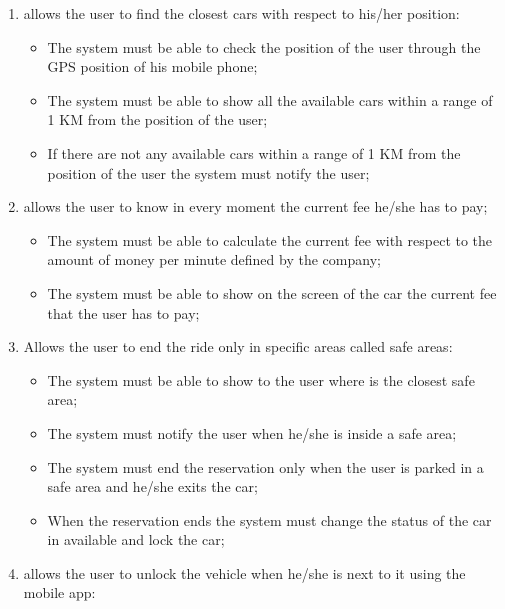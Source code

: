 \begin{enumerate}
\item allows the user to find the closest cars with respect to his/her position:

\begin{itemize}
\item The system must be able to check the position of the user through the GPS position of his mobile phone;
\item The system must be able to show all the available cars within a range of 1 KM from the position of the user;
\item If there are not any available cars within a range of 1 KM from the position of the user the system must notify the user;
\end{itemize}

\item allows the user to know in every moment the current fee he/she has to pay;

\begin{itemize}
\item The system must be able to calculate the current fee with respect to the amount of money per minute defined by the company;
\item The system must be able to show on the screen of the car the current fee that the user has to pay;
\end{itemize}

\item Allows the user to end the ride only in specific areas called safe areas:

\begin{itemize}
\item The system must be able to show to the user where is the closest safe area;
\item The system must notify the user when he/she is inside a safe area;
\item The system must end the reservation only when the user is parked in a safe area and he/she exits the car;
\item When the reservation ends the system must change the status of the car in available and lock the car;
\end{itemize}

\item allows the user to unlock the vehicle when he/she is next to it using the mobile app:


\end{enumerate}
